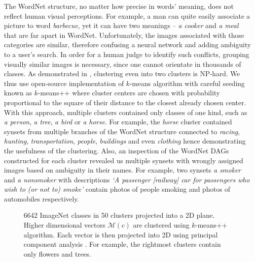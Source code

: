 The WordNet structure, no matter how precise in words' meaning, does not reflect human visual perceptions. For example, a man can quite easily associate a picture to word \textit{barbecue}, yet it can have two meanings -- \textit{a cooker} and \textit{a meal} that are far apart in WordNet. Unfortunately, the images associated with those categories are similar, therefore confusing a neural network and adding ambiguity to a user's search. In order for a human judge to identify such conflicts, grouping visually similar images is necessary, since one cannot orientate in thousands of classes. As demonstrated in \cite{dasgupta2008hardnessKmeans}, clustering even into two clusters is NP-hard. We thus use open-source implementation \cite{scikit-learn} of $k$-means algorithm with careful seeding known as $k$-means++ \cite{kmeans} where cluster centers are chosen with probability proportional to the square of their distance to the closest already chosen center. With this approach, multiple clusters contained only classes of one kind, such as \textit{a person}, \textit{a tree}, \textit{a bird} or \textit{a horse}. For example, the \textit{horse} cluster contained synsets from multiple branches of the WordNet structure connected to \textit{racing}, \textit{hunting}, \textit{transportation}, \textit{people}, \textit{buildings} and even \textit{clothing} hence demonstrating the usefulness of the clustering. Also, an inspection of the WordNet DAGs constructed for each cluster revealed us multiple synsets with wrongly assigned images based on ambiguity in their names. For example, two synsets \textit{a smoker} and \textit{a nonsmoker} with descriptions \textit{`A passenger [railway] car for passengers who wish to (or not to) smoke'} contain photos of people smoking and photos of automobiles respectively.


\begin{figure}
	\centering
	\scalebox{0.8}{}
	\caption[Projection of ImageNet classes into 2D]{6642 ImageNet classes in 50 clusters projected into a 2D plane. Higher dimensional vectors $\mathcal{M}(c)$ are clustered using $k$-means++ \cite{kmeans} algorithm. Each vector is then projected into 2D using principal component analysis \cite{pca}. For example, the rightmost clusters contain only flowers and trees.}
	\label{fig:dataset_clusters}
\end{figure}

